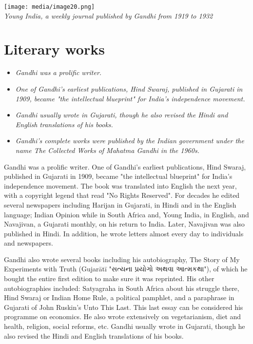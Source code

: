 \texttt{[image: media/image20.png]}\\
\emph{Young India, a weekly journal published by Gandhi from 1919 to
1932}

\section{Literary works}\label{literary-works}

\begin{itemize}
\item
  \emph{Gandhi was a prolific writer.}
\item
  \emph{One of Gandhi's earliest publications, Hind Swaraj, published in
  Gujarati in 1909, became "the intellectual blueprint" for India's
  independence movement.}
\item
  \emph{Gandhi usually wrote in Gujarati, though he also revised the
  Hindi and English translations of his books.}
\item
  \emph{Gandhi's complete works were published by the Indian government
  under the name The Collected Works of Mahatma Gandhi in the 1960s.}
\end{itemize}

Gandhi was a prolific writer. One of Gandhi's earliest publications,
Hind Swaraj, published in Gujarati in 1909, became "the intellectual
blueprint" for India's independence movement. The book was translated
into English the next year, with a copyright legend that read "No Rights
Reserved". For decades he edited several newspapers including Harijan in
Gujarati, in Hindi and in the English language; Indian Opinion while in
South Africa and, Young India, in English, and Navajivan, a Gujarati
monthly, on his return to India. Later, Navajivan was also published in
Hindi. In addition, he wrote letters almost every day to individuals and
newspapers.

Gandhi also wrote several books including his autobiography, The Story
of My Experiments with Truth (Gujarātī "સત્યના પ્રયોગો અથવા આત્મકથા"),
of which he bought the entire first edition to make sure it was
reprinted. His other autobiographies included: Satyagraha in South
Africa about his struggle there, Hind Swaraj or Indian Home Rule, a
political pamphlet, and a paraphrase in Gujarati of John Ruskin's Unto
This Last. This last essay can be considered his programme on economics.
He also wrote extensively on vegetarianism, diet and health, religion,
social reforms, etc. Gandhi usually wrote in Gujarati, though he also
revised the Hindi and English translations of his books.

